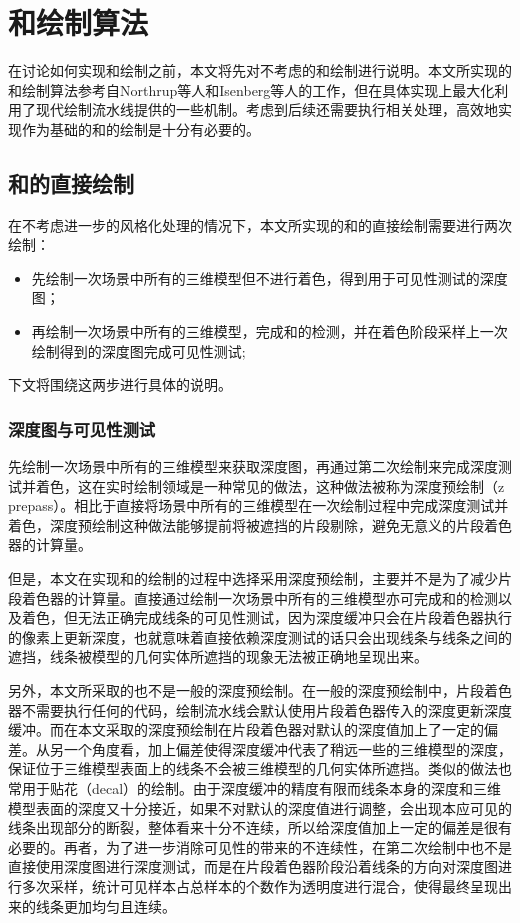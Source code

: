 \chapter{\con{}和\scon{}绘制算法}

在讨论如何实现\stc{}\con{}和\scon{}绘制之前，本文将先对不考虑\stcy{}的\con{}和\scon{}绘制进行说明。本文所实现的\con{}和\scon{}绘制算法参考自Northrup等人和Isenberg等人的工作\cite{northrup2000artistic,isenberg2002stylizing}，但在具体实现上最大化利用了现代绘制流水线提供的一些机制。考虑到后续还需要执行\stc{}相关处理，高效地实现作为基础的\con{}和\scon{}的绘制是十分有必要的。

\section{\con{}和\scon{}的直接绘制}
\label{sec:basic}

在不考虑进一步的风格化处理的情况下，本文所实现的\con{}和\scon{}的直接绘制需要进行两次绘制：

\begin{itemize}
    \item 先绘制一次场景中所有的三维模型但不进行着色，得到用于可见性测试的深度图；
    \item 再绘制一次场景中所有的三维模型，完成\con{}和\scon{}的检测，并在着色阶段采样上一次绘制得到的深度图完成可见性测试;
\end{itemize}

下文将围绕这两步进行具体的说明。

\subsection{深度图与可见性测试}

先绘制一次场景中所有的三维模型来获取深度图，再通过第二次绘制来完成深度测试并着色，这在实时绘制领域是一种常见的做法，这种做法被称为深度预绘制（z prepass）。相比于直接将场景中所有的三维模型在一次绘制过程中完成深度测试并着色，深度预绘制这种做法能够提前将被遮挡的片段剔除，避免无意义的片段着色器的计算量。

但是，本文在实现\con{}和\scon{}的绘制的过程中选择采用深度预绘制，主要并不是为了减少片段着色器的计算量。直接通过绘制一次场景中所有的三维模型亦可完成\con{}和\scon{}的检测以及着色，但无法正确完成线条的可见性测试，因为深度缓冲只会在片段着色器执行的像素上更新深度，也就意味着直接依赖深度测试的话只会出现线条与线条之间的遮挡，线条被模型的几何实体所遮挡的现象无法被正确地呈现出来。

另外，本文所采取的也不是一般的深度预绘制。在一般的深度预绘制中，片段着色器不需要执行任何的代码，绘制流水线会默认使用片段着色器传入的深度更新深度缓冲。而在本文采取的深度预绘制在片段着色器对默认的深度值加上了一定的偏差。从另一个角度看，加上偏差使得深度缓冲代表了稍远一些的三维模型的深度，保证位于三维模型表面上的线条不会被三维模型的几何实体所遮挡。类似的做法也常用于贴花（decal）的绘制。由于深度缓冲的精度有限而线条本身的深度和三维模型表面的深度又十分接近，如果不对默认的深度值进行调整，会出现本应可见的线条出现部分的断裂，整体看来十分不连续，所以给深度值加上一定的偏差是很有必要的。再者，为了进一步消除可见性的带来的不连续性，在第二次绘制中也不是直接使用深度图进行深度测试，而是在片段着色器阶段沿着线条的方向对深度图进行多次采样，统计可见样本占总样本的个数作为透明度进行混合，使得最终呈现出来的线条更加均匀且连续。

